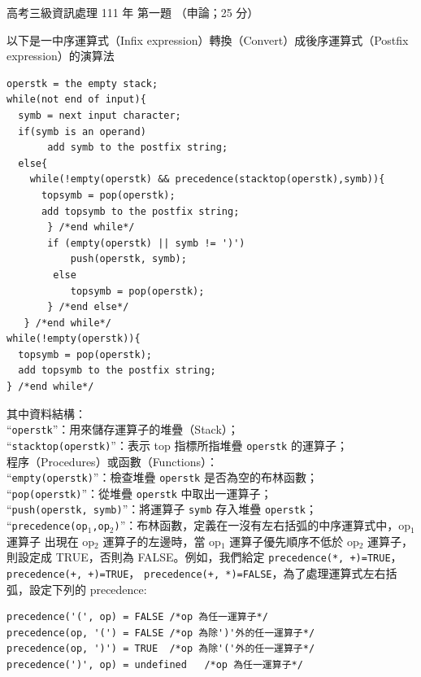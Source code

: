 \begin{pastexam}[label={px:gk3-111-ds-01}]{高考三級資訊處理 111 年 第一題}
（申論；25 分）

以下是一中序運算式（Infix expression）轉換（Convert）成後序運算式（Postfix expression）的演算法
\begin{verbatim}
operstk = the empty stack;
while(not end of input){
  symb = next input character;
  if(symb is an operand)
       add symb to the postfix string;
  else{
    while(!empty(operstk) && precedence(stacktop(operstk),symb)){
      topsymb = pop(operstk);
      add topsymb to the postfix string;
       } /*end while*/
       if (empty(operstk) || symb != ')')
           push(operstk, symb);
        else
           topsymb = pop(operstk);
       } /*end else*/
   } /*end while*/
while(!empty(operstk)){
  topsymb = pop(operstk);
  add topsymb to the postfix string;
} /*end while*/
\end{verbatim}
其中資料結構：\\
“\texttt{operstk}”：用來儲存運算子的堆疊（Stack）；\\
“\texttt{stacktop(operstk)}”：表示 top 指標所指堆疊 \texttt{operstk} 的運算子；\\
程序（Procedures）或函數（Functions）：\\
“\texttt{empty(operstk)}”：檢查堆疊 \texttt{operstk} 是否為空的布林函數；\\
“\texttt{pop(operstk)}”：從堆疊 \texttt{operstk} 中取出一運算子；\\
“\texttt{push(operstk, symb)}”：將運算子 \texttt{symb} 存入堆疊 \texttt{operstk}；\\
“\texttt{precedence(op$_1$,op$_2$)}”：布林函數，定義在一沒有左右括弧的中序運算式中，op$_1$ 運算子
出現在 op$_2$ 運算子的左邊時，當 op$_1$ 運算子優先順序不低於 op$_2$ 運算子，則設定成 TRUE，否則為
FALSE。例如，我們給定 \texttt{precedence(\textquotesingle{}*\textquotesingle{}, \textquotesingle{}+\textquotesingle{})=TRUE}，\texttt{precedence(\textquotesingle{}+\textquotesingle{}, \textquotesingle{}+\textquotesingle{})=TRUE}，
\texttt{precedence(\textquotesingle{}+\textquotesingle{}, \textquotesingle{}*\textquotesingle{})=FALSE}，為了處理運算式左右括弧，設定下列的 precedence:
\begin{verbatim}
precedence('(', op) = FALSE /*op 為任一運算子*/
precedence(op, '(') = FALSE /*op 為除')'外的任一運算子*/
precedence(op, ')') = TRUE  /*op 為除'('外的任一運算子*/
precedence(')', op) = undefined   /*op 為任一運算子*/
\end{verbatim}

\end{pastexam}
